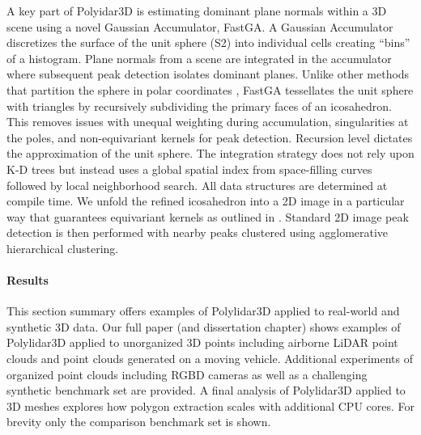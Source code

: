 A key part of Polyidar3D is estimating dominant plane normals within a 3D scene using a novel Gaussian Accumulator, FastGA. A Gaussian Accumulator discretizes the surface of the unit sphere (S2) into individual cells creating ``bins'' of a histogram. Plane normals from a scene are integrated in the accumulator where subsequent peak detection isolates dominant planes. Unlike other methods that partition the sphere in polar coordinates \cite{borrmann_3d_2011, limberger_real-time_2015}, FastGA tessellates the unit sphere with triangles by recursively subdividing the primary faces of an icosahedron. This removes issues with unequal weighting during accumulation, singularities at the poles, and non-equivariant kernels for peak detection.  Recursion level dictates the approximation of the unit sphere. The integration strategy does not rely upon K-D trees but instead uses a global spatial index from space-filling curves followed by local neighborhood search. All data structures are determined at compile time. We unfold the refined icosahedron into a 2D image in a particular way that guarantees equivariant kernels as outlined in \cite{cohen_gauge_2019} . Standard 2D image peak detection is then performed with nearby peaks clustered using agglomerative hierarchical clustering.



\paragraph{Results}

This section summary offers examples of Polylidar3D applied to real-world and synthetic 3D data. Our full paper (and dissertation chapter) shows examples of Polylidar3D applied to unorganized 3D points including airborne LiDAR point clouds and point clouds generated on a moving vehicle.  Additional experiments of organized point clouds including RGBD cameras as well as a challenging synthetic benchmark set are provided. A final analysis of Polylidar3D applied to 3D meshes explores how polygon extraction scales with additional CPU cores. For brevity only the comparison benchmark set is shown. 


